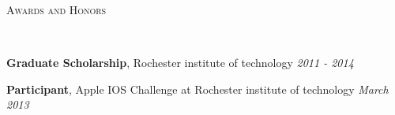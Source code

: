 \documentclass[9pt]{article}
\newenvironment{changemargin}[2]{%
  \begin{list}{}{%
    \setlength{\topsep}{0pt}%
    \setlength{\leftmargin}{#1}%
    \setlength{\rightmargin}{#2}%
    \setlength{\listparindent}{\parindent}%
    \setlength{\itemindent}{\parindent}%
    \setlength{\parsep}{\parskip}%
  }%
  \item[]}{\end{list}
}
\newcommand{\lineover}{
	\begin{changemargin}{-0.05in}{-0.05in}
		\vspace*{-8pt}
		\hrulefill \\
		\vspace*{-2pt}
	\end{changemargin}
}
\newcommand{\header}[1]{
	\begin{changemargin}{-0.5in}{-0.5in}
		\scshape{#1}\\
  	\lineover
	\end{changemargin}
}
\newenvironment{body} {
	\vspace*{-16pt}
	\begin{changemargin}{-0.25in}{-0.5in}
  }	
	{\end{changemargin}
}
\begin{document}
\smallskip


\header{Awards and Honors}

\begin{body}
	\vspace{14pt}
	\textbf{Graduate Scholarship}, Rochester institute of technology \hfill{} \emph{2011 - 2014}\\
	\smallskip
	
	\textbf{Participant}, Apple IOS Challenge at Rochester institute of technology \hfill{} \emph{March 2013}\\
\end{body}
\end{document}
